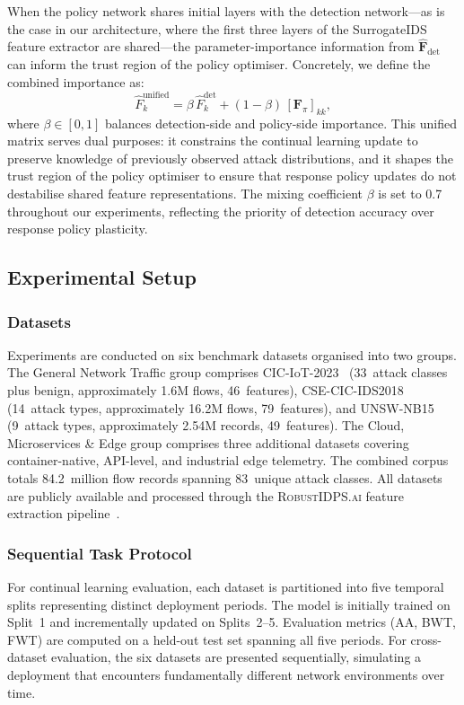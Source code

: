 \documentclass[journal]{IEEEtran}
\theoremstyle{definition}
\theoremstyle{remark}
\newcommand{\RobustIDPS}{\textsc{RobustIDPS.ai}}
\newcommand{\FIM}{\mathbf{F}}
\begin{document}
When the policy network shares initial layers with the detection network---as is the case in our architecture, where the first three layers of the SurrogateIDS feature extractor are shared---the parameter-importance information from $\hat{\FIM}_{\mathrm{det}}$ can inform the trust region of the policy optimiser. Concretely, we define the combined importance as:
\begin{equation}
\label{eq:unified_fim}
\hat{F}_k^{\mathrm{unified}} = \beta\,\hat{F}_k^{\mathrm{det}} + (1-\beta)\,[\FIM_\pi]_{kk},
\end{equation}
where $\beta \in [0,1]$ balances detection-side and policy-side importance. This unified matrix serves dual purposes: it constrains the continual learning update to preserve knowledge of previously observed attack distributions, and it shapes the trust region of the policy optimiser to ensure that response policy updates do not destabilise shared feature representations. The mixing coefficient $\beta$ is set to 0.7 throughout our experiments, reflecting the priority of detection accuracy over response policy plasticity.

\subsection{Experimental Setup}
\label{subsec:exp_setup}

\subsubsection{Datasets}
\label{subsubsec:datasets}
Experiments are conducted on six benchmark datasets organised into two groups. The General Network Traffic group comprises CIC-IoT-2023~\cite{neto2023ciciot} (33~attack classes plus benign, approximately 1.6M flows, 46~features), CSE-CIC-IDS2018~\cite{cicids2018} (14~attack types, approximately 16.2M flows, 79~features), and UNSW-NB15~\cite{moustafa2015unswnb15} (9~attack types, approximately 2.54M records, 49~features). The Cloud, Microservices \& Edge group comprises three additional datasets covering container-native, API-level, and industrial edge telemetry. The combined corpus totals 84.2~million flow records spanning 83~unique attack classes. All datasets are publicly available and processed through the \RobustIDPS{} feature extraction pipeline~\cite{anaedevha2026stochastic}.

\subsubsection{Sequential Task Protocol}
For continual learning evaluation, each dataset is partitioned into five temporal splits representing distinct deployment periods. The model is initially trained on Split~1 and incrementally updated on Splits~2--5. Evaluation metrics (AA, BWT, FWT) are computed on a held-out test set spanning all five periods. For cross-dataset evaluation, the six datasets are presented sequentially, simulating a deployment that encounters fundamentally different network environments over time.
\end{document}
